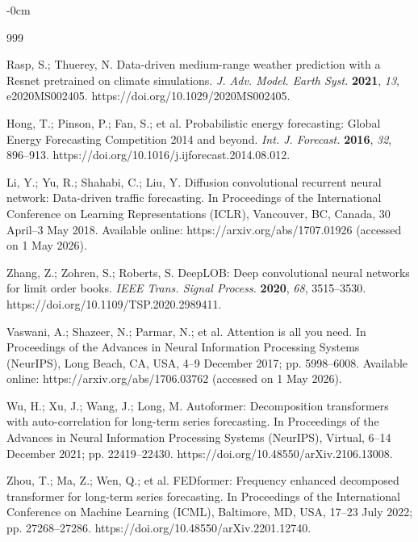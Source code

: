 \documentclass[symmetry,article,submit,pdftex,moreauthors]{Definitions/mdpi}
\begin{document}
\begin{adjustwidth}{-\extralength}{0cm}


\begin{thebibliography}{999}

Rasp, S.; Thuerey, N. Data-driven medium-range weather prediction with a Resnet pretrained on climate simulations. \textit{J. Adv. Model. Earth Syst.} \textbf{2021}, \textit{13}, e2020MS002405. https://doi.org/10.1029/2020MS002405.

Hong, T.; Pinson, P.; Fan, S.; et al. Probabilistic energy forecasting: Global Energy Forecasting Competition 2014 and beyond. \textit{Int. J. Forecast.} \textbf{2016}, \textit{32}, 896--913. https://doi.org/10.1016/j.ijforecast.2014.08.012.

Li, Y.; Yu, R.; Shahabi, C.; Liu, Y. Diffusion convolutional recurrent neural network: Data-driven traffic forecasting. In Proceedings of the International Conference on Learning Representations (ICLR), Vancouver, BC, Canada, 30 April--3 May 2018. Available online: https://arxiv.org/abs/1707.01926 (accessed on 1 May 2026).

Zhang, Z.; Zohren, S.; Roberts, S. DeepLOB: Deep convolutional neural networks for limit order books. \textit{IEEE Trans. Signal Process.} \textbf{2020}, \textit{68}, 3515--3530. https://doi.org/10.1109/TSP.2020.2989411.

Vaswani, A.; Shazeer, N.; Parmar, N.; et al. Attention is all you need. In Proceedings of the Advances in Neural Information Processing Systems (NeurIPS), Long Beach, CA, USA, 4--9 December 2017; pp. 5998--6008. Available online: https://arxiv.org/abs/1706.03762 (accessed on 1 May 2026).

Wu, H.; Xu, J.; Wang, J.; Long, M. Autoformer: Decomposition transformers with auto-correlation for long-term series forecasting. In Proceedings of the Advances in Neural Information Processing Systems (NeurIPS), Virtual, 6--14 December 2021; pp. 22419--22430. https://doi.org/10.48550/arXiv.2106.13008.

Zhou, T.; Ma, Z.; Wen, Q.; et al. FEDformer: Frequency enhanced decomposed transformer for long-term series forecasting. In Proceedings of the International Conference on Machine Learning (ICML), Baltimore, MD, USA, 17--23 July 2022; pp. 27268--27286. https://doi.org/10.48550/arXiv.2201.12740.


\end{thebibliography}
\end{adjustwidth}
\end{document}

